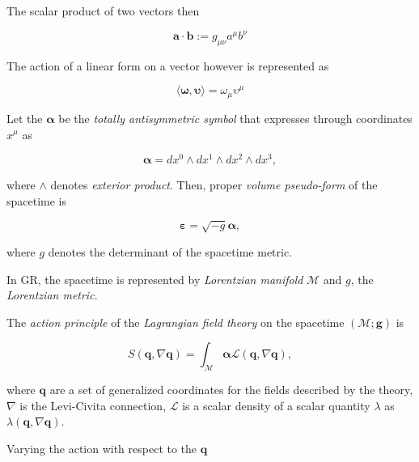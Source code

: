 {    The scalar product of two vectors then 
    
    \begin{equation}
        \boldsymbol{a}\cdot\boldsymbol{b}:=g_{\mu\nu}a^{\mu}b^{\nu}
    \end{equation}
    
    The action of a linear form on a vector however is represented as 
    
    \begin{equation}
        \langle\boldsymbol{\omega},\boldsymbol{\upsilon}\rangle=\omega_{\mu}\upsilon^{\mu}
    \end{equation}
    
    Let the $\boldsymbol{\alpha}$ be the \textit{totally antisymmetric symbol} that expresses through coordinates $x^{\mu}$ as
    
    \begin{equation}
        \boldsymbol{\alpha} = dx^0 \wedge dx^1 \wedge dx^2 \wedge dx^3,
    \end{equation}
    
    where $\wedge$ denotes \textit{exterior product}. 
    Then, proper \textit{volume pseudo-form} of the spacetime is
    
    \begin{equation}
        \boldsymbol{\varepsilon} = \sqrt{-g}\boldsymbol{\alpha},
    \end{equation}
    
    where $g$ denotes the determinant of the spacetime metric.
    
    In GR, the spacetime is represented by \textit{Lorentzian manifold} $\mathcal{M}$ and $g$, the \textit{Lorentzian metric}.
    
    The \textit{action principle} of the \textit{Lagrangian field theory} on the spacetime $(\mathcal{M}; \boldsymbol{g})$ is
    
    \begin{equation}
        S(\boldsymbol{q}, \nabla\boldsymbol{q}) = \int_{\mathcal{M}}\boldsymbol{\alpha}\mathcal{L}(\boldsymbol{q}, \nabla\boldsymbol{q}),
    \end{equation}
    
    where $\boldsymbol{q}$ are a set of generalized coordinates for the fields described by the theory, $\nabla$ is the Levi-Civita connection, $\mathcal{L}$ is a scalar density of a scalar quantity $\lambda$ as $\lambda(\boldsymbol{q},\nabla\boldsymbol{q})$. 
    
    Varying the action with respect to the $\boldsymbol{q}$
    
}
